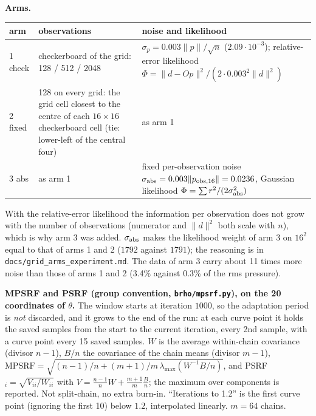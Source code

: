 \documentclass[11pt]{article}
\begin{document}
\textbf{Arms.}
\begin{center}\small
\begin{tabular}{@{}p{}p{}p{}@{}}\toprule
arm & observations & noise and likelihood\\ \midrule
1 check & checkerboard of the grid: 128 / 512 / 2048 & $\sigma_p=0.003\|p\|/\sqrt n$ ($2.09\cdot10^{-3}$); relative-error likelihood $\Phi=\|d-Op\|^2/(2\cdot0.003^2\|d\|^2)$\\
2 fixed & 128 on every grid: the grid cell closest to the centre of each $16\times16$ checkerboard cell (tie: lower-left of the central four) & as arm 1\\
3 abs & as arm 1 & fixed per-observation noise $\sigma_{\rm abs}=0.003\|p_{\rm obs,16}\|=0.0236$, Gaussian likelihood $\Phi=\sum r^2/(2\sigma_{\rm abs}^2)$\\ \bottomrule
\end{tabular}
\end{center}
With the relative-error likelihood the information per observation does not grow with the number of observations (numerator and $\|d\|^2$ both scale with $n$), which is why arm 3 was added. $\sigma_{\rm abs}$ makes the likelihood weight of arm 3 on $16^2$ equal to that of arms 1 and 2 ($1792$ against $1791$); the reasoning is in \texttt{docs/grid\_arms\_experiment.md}. The data of arm 3 carry about 11 times more noise than those of arms 1 and 2 (3.4\% against 0.3\% of the rms pressure).

\textbf{MPSRF and PSRF (group convention, \texttt{brho/mpsrf.py}), on the 20 coordinates of $\theta$.} The window starts at iteration $1000$, so the adaptation period is \emph{not} discarded, and it grows to the end of the run: at each curve point it holds the saved samples from the start to the current iteration, every 2nd sample, with a curve point every 15 saved samples. $W$ is the average within-chain covariance (divisor $n-1$), $B/n$ the covariance of the chain means (divisor $m-1$), $\mathrm{MPSRF}=\sqrt{(n-1)/n+(m+1)/m\,\lambda_{\max}(W^{-1}B/n)}$, and PSRF$_i=\sqrt{V_{ii}/W_{ii}}$ with $V=\frac{n-1}{n}W+\frac{m+1}{m}\frac Bn$; the maximum over components is reported. Not split-chain, no extra burn-in. ``Iterations to 1.2'' is the first curve point (ignoring the first 10) below $1.2$, interpolated linearly. $m=64$ chains.
\end{document}
